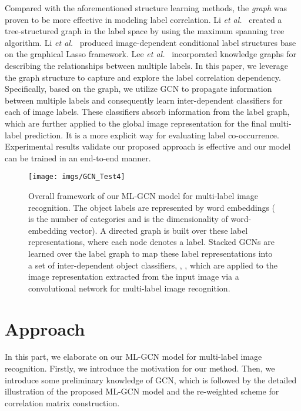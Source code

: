 \documentclass[10pt,twocolumn,letterpaper]{article}
\begin{document}
Compared with the aforementioned structure learning methods, the \emph{graph} was proven to be more effective in modeling label correlation. Li \emph{et al.}~\cite{tree} created a tree-structured graph in the label space by using the maximum spanning tree algorithm. Li \emph{et al.}~\cite{conditional} produced image-dependent conditional label structures base on the graphical Lasso framework. Lee \emph{et al.}~\cite{ml-zsl} incorporated knowledge graphs for describing the relationships between multiple labels. In this paper, we leverage the graph structure to capture and explore the label correlation dependency. Specifically, based on the graph, we utilize GCN to propagate information between multiple labels and consequently learn inter-dependent classifiers for each of image labels. These classifiers absorb information from the label graph, which are further applied to the global image representation for the final multi-label prediction. It is a more explicit way for evaluating label co-occurrence. Experimental results validate our proposed approach is effective and our model can be trained in an end-to-end manner. 

\begin{figure*}
	\centering
	\texttt{[image: imgs/GCN\_Test4]}
	\vspace{0.5em}
	\caption{Overall framework of our ML-GCN model for multi-label image recognition.
The object labels are represented by {word embeddings}  ( is the number of categories and  is the dimensionality of word-embedding vector). A directed graph is built over these label representations, where each node denotes a label. Stacked GCNs are learned over the label graph to map these label representations into a set of inter-dependent object classifiers, \ie, , which are applied to the image representation extracted from the input image via a convolutional network for multi-label image recognition.}


\vspace{-0.5em}
	\label{fig:model}
\end{figure*}


\section{Approach}

In this part, we elaborate on our ML-GCN model for multi-label image recognition. Firstly, we introduce the motivation for our method. Then, we introduce some preliminary knowledge of GCN, which is followed by the detailed illustration of the proposed ML-GCN model and the re-weighted scheme for correlation matrix construction.
\end{document}
